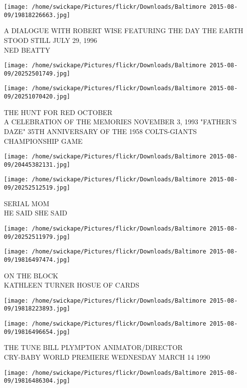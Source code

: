 \documentclass[10pt,letterpaper]{article}
\begin{document}
\vspace{0.25in}
\texttt{[image: /home/swickape/Pictures/flickr/Downloads/Baltimore 2015-08-09/19818226663.jpg]}

A DIALOGUE WITH ROBERT WISE FEATURING THE DAY THE EARTH STOOD STILL JULY 29, 1996\\
NED BEATTY
\pagebreak

\texttt{[image: /home/swickape/Pictures/flickr/Downloads/Baltimore 2015-08-09/20252501749.jpg]}

\vspace{0.25in}
\texttt{[image: /home/swickape/Pictures/flickr/Downloads/Baltimore 2015-08-09/20251070420.jpg]}

THE HUNT FOR RED OCTOBER\\
A CELEBRATION OF THE MEMORIES NOVEMBER 3, 1993 "FATHER'S DAZE" 35TH ANNIVERSARY OF THE 1958 COLTS{-}GIANTS CHAMPIONSHIP GAME
\pagebreak

\texttt{[image: /home/swickape/Pictures/flickr/Downloads/Baltimore 2015-08-09/20445382131.jpg]}

\vspace{0.25in}
\texttt{[image: /home/swickape/Pictures/flickr/Downloads/Baltimore 2015-08-09/20252512519.jpg]}

SERIAL MOM\\
HE SAID SHE SAID
\pagebreak

\texttt{[image: /home/swickape/Pictures/flickr/Downloads/Baltimore 2015-08-09/20252511979.jpg]}

\vspace{0.25in}
\texttt{[image: /home/swickape/Pictures/flickr/Downloads/Baltimore 2015-08-09/19816497474.jpg]}

ON THE BLOCK\\
KATHLEEN TURNER HOSUE OF CARDS
\pagebreak

\texttt{[image: /home/swickape/Pictures/flickr/Downloads/Baltimore 2015-08-09/19818223893.jpg]}

\vspace{0.25in}
\texttt{[image: /home/swickape/Pictures/flickr/Downloads/Baltimore 2015-08-09/19816496654.jpg]}

THE TUNE BILL PLYMPTON ANIMATOR/DIRECTOR\\
CRY{-}BABY WORLD PREMIERE WEDNESDAY MARCH 14 1990
\pagebreak

\texttt{[image: /home/swickape/Pictures/flickr/Downloads/Baltimore 2015-08-09/19816486304.jpg]}
\end{document}
